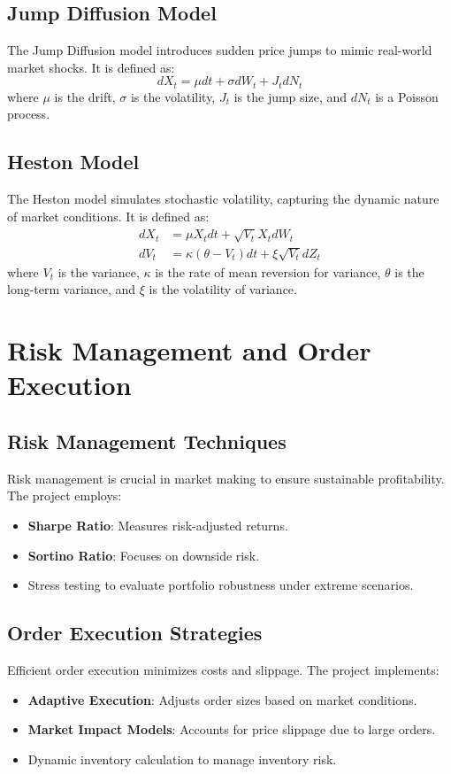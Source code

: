 \documentclass[12pt]{article}
\begin{document}
\subsection{Jump Diffusion Model}
The Jump Diffusion model introduces sudden price jumps to mimic real-world market shocks. It is defined as:
\begin{equation}
    dX_t = \mu dt + \sigma dW_t + J_t dN_t
\end{equation}
where $\mu$ is the drift, $\sigma$ is the volatility, $J_t$ is the jump size, and $dN_t$ is a Poisson process.

\subsection{Heston Model}
The Heston model simulates stochastic volatility, capturing the dynamic nature of market conditions. It is defined as:
\begin{align}
    dX_t &= \mu X_t dt + \sqrt{V_t} X_t dW_t \\
    dV_t &= \kappa(\theta - V_t)dt + \xi \sqrt{V_t} dZ_t
\end{align}
where $V_t$ is the variance, $\kappa$ is the rate of mean reversion for variance, $\theta$ is the long-term variance, and $\xi$ is the volatility of variance.

\section{Risk Management and Order Execution}
\subsection{Risk Management Techniques}
Risk management is crucial in market making to ensure sustainable profitability. The project employs:
\begin{itemize}
    \item \textbf{Sharpe Ratio}: Measures risk-adjusted returns.
    \item \textbf{Sortino Ratio}: Focuses on downside risk.
    \item Stress testing to evaluate portfolio robustness under extreme scenarios.
\end{itemize}

\subsection{Order Execution Strategies}
Efficient order execution minimizes costs and slippage. The project implements:
\begin{itemize}
    \item \textbf{Adaptive Execution}: Adjusts order sizes based on market conditions.
    \item \textbf{Market Impact Models}: Accounts for price slippage due to large orders.
    \item Dynamic inventory calculation to manage inventory risk.
\end{itemize}
\end{document}
